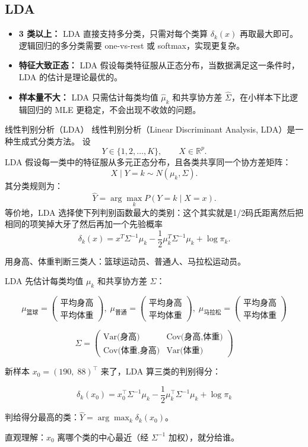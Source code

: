 \subsection{LDA}
\begin{dxtips}[什么时候用LDA]
    \begin{itemize}
    \item \textbf{3 类以上：} LDA 直接支持多分类，只需对每个类算 $\delta_k(x)$ 再取最大即可。逻辑回归的多分类需要 one-vs-rest 或 softmax，实现更复杂。
    \item \textbf{特征大致正态：} LDA 假设每类特征服从正态分布，当数据满足这一条件时，LDA 的估计是理论最优的。
    \item \textbf{样本量不大：} LDA 只需估计每类均值 $\hat\mu_k$ 和共享协方差 $\hat\Sigma$，在小样本下比逻辑回归的 MLE 更稳定，不会出现不收敛的问题。
\end{itemize}
\end{dxtips}
\begin{definition}{线性判别分析（LDA）}
线性判别分析（Linear Discriminant Analysis, LDA）是一种生成式分类方法。
设
\[
Y\in\{1,2,\ldots,K\},\qquad X\in\mathbb{R}^p.
\]
LDA 假设每一类中的特征服从多元正态分布，且各类共享同一个协方差矩阵：
\[
X\mid Y=k \sim N(\mu_k,\Sigma).
\]
其分类规则为：
\[
\hat{Y}=\arg\max_k P(Y=k\mid X=x).
\]
等价地，LDA 选择使下列判别函数最大的类别：这个其实就是1/2码氏距离然后把相同的项笑掉大牙了然后再加一个先验概率
\[
\delta_k(x)
=
x^T\Sigma^{-1}\mu_k
-
\frac{1}{2}\mu_k^T\Sigma^{-1}\mu_k
+
\log \pi_k.
\]
\end{definition}
\begin{example}
用身高、体重判断三类人：篮球运动员、普通人、马拉松运动员。

LDA 先估计每类均值 $\mu_k$ 和共享协方差 $\Sigma$：

\[
\mu_{\text{篮球}} = \begin{pmatrix}\text{平均身高}\\ \text{平均体重}\end{pmatrix},\;
\mu_{\text{普通}} = \begin{pmatrix}\text{平均身高}\\ \text{平均体重}\end{pmatrix},\;
\mu_{\text{马拉松}} = \begin{pmatrix}\text{平均身高}\\ \text{平均体重}\end{pmatrix}
\]

\[
\Sigma = \begin{pmatrix}
\text{Var(身高)} & \text{Cov(身高,体重)}\\
\text{Cov(体重,身高)} & \text{Var(体重)}
\end{pmatrix}
\]

新样本 $x_0 = (190,\;88)^\top$ 来了，LDA 算三类的判别得分：

\[
\delta_k(x_0) = x_0^\top \Sigma^{-1}\mu_k - \frac12 \mu_k^\top \Sigma^{-1}\mu_k + \log\pi_k
\]

判给得分最高的类：$\hat Y = \arg\max_k \delta_k(x_0)$。

直观理解：$x_0$ 离哪个类的中心最近（经 $\Sigma^{-1}$ 加权），就分给谁。
\end{example}
